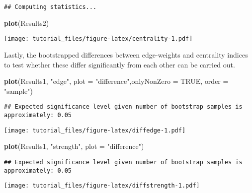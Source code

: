 \documentclass[]{article}
\newenvironment{Shaded}{\begin{snugshade}}{\end{snugshade}}
\newcommand{\KeywordTok}[1]{\textcolor[rgb]{0.13,0.29,0.53}{\textbf{#1}}}
\newcommand{\DataTypeTok}[1]{\textcolor[rgb]{0.13,0.29,0.53}{#1}}
\newcommand{\StringTok}[1]{\textcolor[rgb]{0.31,0.60,0.02}{#1}}
\newcommand{\OtherTok}[1]{\textcolor[rgb]{0.56,0.35,0.01}{#1}}
\newcommand{\NormalTok}[1]{#1}
\begin{document}
\begin{verbatim}
## Computing statistics...
\end{verbatim}

\begin{Shaded}
\begin{Highlighting}[]
\KeywordTok{plot}\NormalTok{(Results2)}
\end{Highlighting}
\end{Shaded}

\texttt{[image: tutorial\_files/figure-latex/centrality-1.pdf]}

Lastly, the bootstrapped differences between edge-weights and centrality
indices to test whether these differ significantly from each other can
be carried out.

\begin{Shaded}
\begin{Highlighting}[]
\KeywordTok{plot}\NormalTok{(Results1, }\StringTok{"edge"}\NormalTok{, }\DataTypeTok{plot =} \StringTok{"difference"}\NormalTok{,}\DataTypeTok{onlyNonZero =} \OtherTok{TRUE}\NormalTok{, }\DataTypeTok{order =} \StringTok{"sample"}\NormalTok{)}
\end{Highlighting}
\end{Shaded}

\begin{verbatim}
## Expected significance level given number of bootstrap samples is approximately: 0.05
\end{verbatim}

\texttt{[image: tutorial\_files/figure-latex/diffedge-1.pdf]}

\begin{Shaded}
\begin{Highlighting}[]
\KeywordTok{plot}\NormalTok{(Results1, }\StringTok{"strength"}\NormalTok{, }\DataTypeTok{plot =} \StringTok{"difference"}\NormalTok{)}
\end{Highlighting}
\end{Shaded}

\begin{verbatim}
## Expected significance level given number of bootstrap samples is approximately: 0.05
\end{verbatim}

\texttt{[image: tutorial\_files/figure-latex/diffstrength-1.pdf]}
\end{document}

